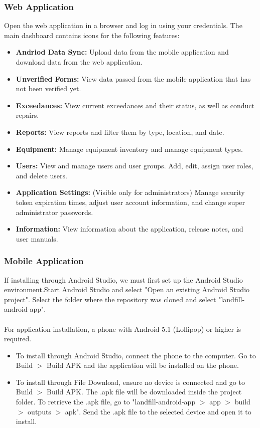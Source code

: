 \documentclass[12pt]{article}
\begin{document}
\subsubsection{Web Application}
Open the web application in a browser and log in using your credentials. The main dashboard contains icons for the following features:
\begin{itemize}
    \item \textbf{Andriod Data Sync:} Upload data from the mobile application and download data from the web application.
    \item \textbf{Unverified Forms:} View data passed from the mobile application that has not been verified yet.
    \item \textbf{Exceedances:} View current exceedances and their status, as well as conduct repairs.
    \item \textbf{Reports:} View reports and filter them by type, location, and date.
    \item \textbf{Equipment:} Manage equipment inventory and manage equipment types.
    \item \textbf{Users:} View and manage users and user groups. Add, edit, assign user roles, and delete users.
    \item \textbf{Application Settings:} (Visible only for administrators) Manage security token expiration times, adjust user account information, and change super administrator passwords.
    \item \textbf{Information:} View information about the application, release notes, and user manuals.
\end{itemize}
\subsubsection{Mobile Application}
If installing through Android Studio, we must first set up the Android Studio environment.Start Android Studio and select "Open an existing Android Studio project". Select the folder where the repository was cloned and select "landfill-android-app". \\\\
For application installation, a phone with Android 5.1 (Lollipop) or higher is required. 
\begin{itemize}
\item To install through Android Studio, connect the phone to the computer. Go to Build $>$ Build APK and the application will be installed on the phone. 
\item To install through File Download, ensure no device is connected and go to Build $>$ Build APK. The .apk file will be downloaded inside the project folder. To retrieve the .apk file, go to "landfill-android-app $>$ app $>$ build $>$ outputs $>$ apk". Send the .apk file to the selected device and open it to install.
\end{itemize}
\end{document}
